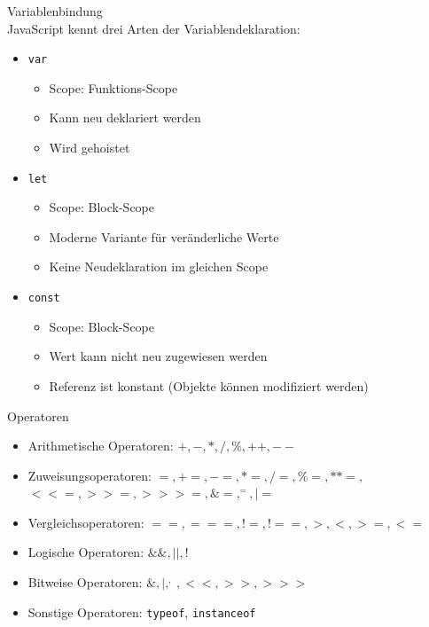 \begin{theorem}{Variablenbindung}\\
    JavaScript kennt drei Arten der Variablendeklaration:
    \begin{itemize}
        \item \texttt{var}
            \begin{itemize}
                \item Scope: Funktions-Scope
                \item Kann neu deklariert werden
                \item Wird gehoistet
            \end{itemize}
        \item \texttt{let}
            \begin{itemize}
                \item Scope: Block-Scope
                \item Moderne Variante für veränderliche Werte
                \item Keine Neudeklaration im gleichen Scope
            \end{itemize}
        \item \texttt{const}
            \begin{itemize}
                \item Scope: Block-Scope
                \item Wert kann nicht neu zugewiesen werden
                \item Referenz ist konstant (Objekte können modifiziert werden)
            \end{itemize}
    \end{itemize}
\end{theorem}

\begin{corollary}{Operatoren}
    \begin{itemize}
        \item Arithmetische Operatoren: $+, -, *, /, \%, ++, --$
        \item Zuweisungsoperatoren: $=, +=, -=, *=, /=, \%=, **=, $\\$<<=, >>=, >>>=, \&=, ^=, |=$
        \item Vergleichsoperatoren: $==, ===, !=, !==, >, <, >=, <=$
        \item Logische Operatoren: $\&\&, ||, !$
        \item Bitweise Operatoren: $\&, |, ^, ~, <<, >>, >>>$
        \item Sonstige Operatoren: \texttt{typeof}, \texttt{instanceof}
    \end{itemize}
\end{corollary}

